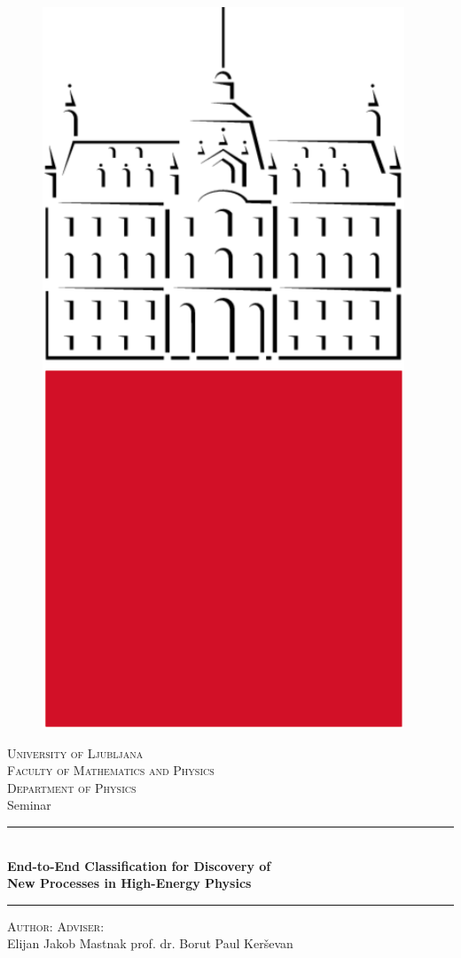 \documentclass[11pt, a4paper]{article}
\begin{document}
\thispagestyle{empty}
\begin{center}

    \begin{figure}[htb!]
        \centering
        \includegraphics[width=0.1\linewidth]{raster/ul-logo}
    \end{figure}
    \huge{\textsc{University of Ljubljana}}\\
    \LARGE{\textsc{Faculty of {\color{ul-red} Mathematics and Physics}}}\\[1mm]
    \Large{\textsc{Department of Physics}}\\
    \vspace{5mm}
    \huge{Seminar}\\
    \vspace{5mm}
    \rule{\textwidth}{0.2pt}\\[3mm]
    \LARGE{\textbf{End-to-End Classification for Discovery of\\New Processes in High-Energy Physics}}
    \rule{\textwidth}{0.2pt}

    \vspace{5mm}


    \begin{minipage}[t]{0.90\textwidth}
        \normalsize{\textsc{Author:}} \hfill \large{\textsc{Adviser}:}\\
    \large{Elijan Jakob Mastnak} \hfill \large{prof. dr. Borut Paul Ker\v{s}evan}
    \end{minipage}

\end{center}
\end{document}
